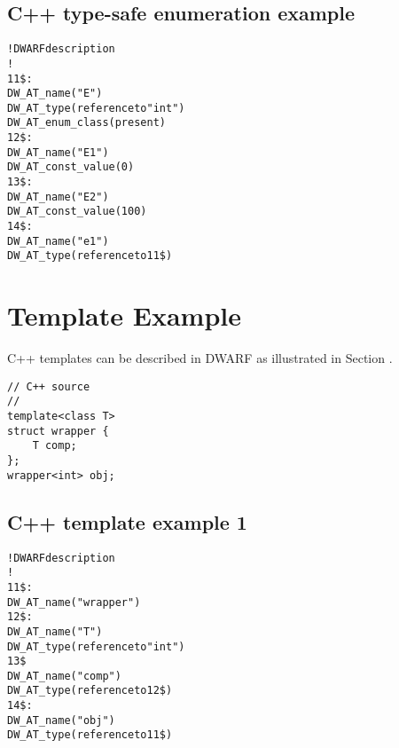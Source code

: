 \subsection{C++ type-safe enumeration example}
\label{app:ctypesafeenumerationexample}
\begin{alltt}
! DWARF description
!
11\$: 
        DW\-\_AT\-\_name("E")
        DW\-\_AT\-\_type(reference to "int")
        DW\-\_AT\-\_enum\-\_class(present)
12\$:   
            DW\-\_AT\-\_name("E1")
            DW\-\_AT\-\_const\-\_value(0)
13\$:
            DW\-\_AT\-\_name("E2")
            DW\-\_AT\-\_const\-\_value(100)
14\$: 
        DW\-\_AT\-\_name("e1")
        DW\-\_AT\-\_type(reference to 11\$)
\end{alltt}

\section{Template Example}
\label{app:templateexample}

C++ templates can be described in DWARF as illustrated in 
Section .



\begin{lstlisting}
// C++ source
//
template<class T>
struct wrapper {
    T comp;
};
wrapper<int> obj;
\end{lstlisting}

\subsection{C++ template example 1}
\label{app:ctemplateexample1}
\begin{alltt}
! DWARF description
!
11\$: 
        DW\-\_AT\-\_name("wrapper")
12\$: 
        DW\-\_AT\-\_name("T")
        DW\-\_AT\-\_type(reference to "int")
13\$ 
        DW\-\_AT\-\_name("comp")
        DW\-\_AT\-\_type(reference to 12\$)
14\$: 
        DW\-\_AT\-\_name("obj")
        DW\-\_AT\-\_type(reference to 11\$)
\end{alltt}

